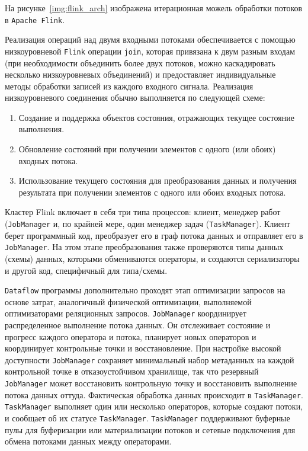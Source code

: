 На рисунке~\ref{img:flink_arch} изображена итерационная можель обработки потоков в \texttt{Apache Flink}.

Реализация операций над двумя входными потоками обеспечивается с помощью низкоуровневой \texttt{Flink} операции \texttt{join}, которая привязана к двум разным входам (при необходимости объединить более двух потоков, можно каскадировать несколько низкоуровневых объединений) и предоставляет индивидуальные методы обработки записей из каждого входного сигнала. 
Реализация низкоуровневого соединения обычно выполняется по следующей схеме:
\begin{enumerate}
  \item Создание и поддержка объектов состояния, отражающих текущее состояние выполнения.
  \item Обновление состояний при получении элементов с одного (или обоих) входных потока.
  \item Использование текущего состояния для преобразования данных и получения результата при получении элементов с одного или обоих входных потока.
\end{enumerate}

Кластер Flink включает в себя три типа процессов: клиент, менеджер работ (\texttt{JobManager} и, по крайней мере, один менеджер задач (\texttt{TaskManager}). Клиент берет программный код, преобразует его в граф потока данных и отправляет его в \texttt{JobManager}. На этом этапе преобразования также проверяются типы данных (схемы) данных, которыми обмениваются операторы, и создаются сериализаторы и другой код, специфичный для типа/схемы. 

\texttt{Dataflow} программы дополнительно проходят этап оптимизации запросов на основе затрат, аналогичный физической оптимизации, выполняемой оптимизаторами реляционных запросов.
\texttt{JobManager} координирует распределенное выполнение потока данных. 
Он отслеживает состояние и прогресс каждого оператора и потока, планирует новых операторов и координирует контрольные точки и восстановление.
При настройке высокой доступности \texttt{JobManager} сохраняет минимальный набор метаданных на каждой контрольной точке в отказоустойчивом хранилище, так что резервный \texttt{JobManager} может восстановить контрольную точку и восстановить выполнение потока данных оттуда. 
Фактическая обработка данных происходит в \texttt{TaskManager}.
\texttt{TaskManager} выполняет один или несколько операторов, которые создают потоки, и сообщает об их статусе \texttt{TaskManager}. 
\texttt{TaskManager} поддерживают буферные пулы для буферизации или материализации потоков и сетевые подключения для обмена потоками данных между операторами.

